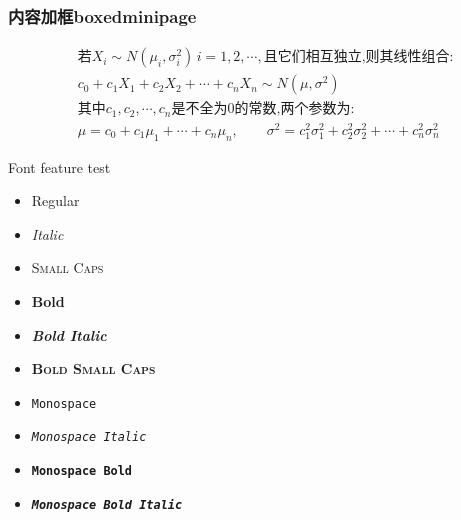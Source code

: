 \begin{frame}
  \frametitle{内容加框boxedminipage}
  \begin{boxedminipage}{0.9\linewidth}
    \[\begin{aligned}
    & \text{若}X_i\sim N(\mu_i,\sigma_i^2)\, i=1,2,\cdots,\text{且它们相互独立,则其线性组合:}\\
    & c_0+c_1X_1+c_2X_2+\cdots+c_nX_n\sim N(\mu,\sigma^2)\\
    & \text{其中}c_1,c_2,\cdots,c_n \text{是不全为0的常数,两个参数为:}\\
    & \mu=c_0+c_1\mu_1+\cdots+c_n\mu_n,\qquad \sigma^2=c_1^2\sigma_1^2+c_2^2\sigma_2^2+\cdots+c_n^2\sigma_n^2
    \end{aligned}\]
    \vspace{2pt}
    \end{boxedminipage}
\end{frame}

\begin{frame}{Font feature test}
  \begin{itemize}
    \item Regular
    \item \textit{Italic}
    \item \textsc{Small Caps}
    \item \textbf{Bold}
    \item \textbf{\textit{Bold Italic}}
    \item \textbf{\textsc{Bold Small Caps}}
    \item \texttt{Monospace}
    \item \texttt{\textit{Monospace Italic}}
    \item \texttt{\textbf{Monospace Bold}}
    \item \texttt{\textbf{\textit{Monospace Bold Italic}}}
  \end{itemize}
\end{frame}

